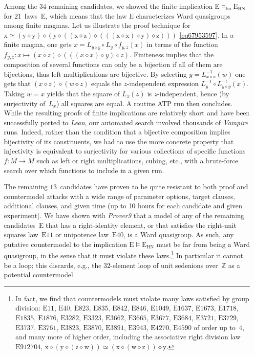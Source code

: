 \documentclass[12pt]{amsart}
\theoremstyle{definition}
\newcommand{\x}{\mathrm{x}}
\newcommand{\y}{\mathrm{y}}
\newcommand{\z}{\mathrm{z}}
\newcommand{\w}{\mathrm{w}}
\newcommand{\op}{\diamond}
\newcommand{\formaleq}{\simeq}
\newcommand{\modelsfin}{\models_{\mathrm{fin}}}
\newcommand{\Eq}[1]{\mathrm{E}#1}
\newcommand{\E}{\mathrm{E}}
\begin{document}
Among the $34$ remaining candidates, we showed the finite implication $\E\modelsfin\E_{\mathrm{HN}}$ for $21$~laws~$\E$, which means that the law $\E$ characterizes Ward quasigroups among finite magmas.  Let us illustrate the proof technique for $\x \formaleq (\y \op \y) \op (\y \op ((\x \op \z) \op (((\x \op \x) \op \y) \op \z)))$ \eqref{eq67953597}.  In a finite magma, one gets $x = L_{y\op y} \circ L_y \circ f_{y,z}(x)$ in terms of the function $f_{y,z}\colon x \mapsto (x\op z) \op (((x \op x) \op y) \op z)$.  Finiteness implies that the composition of several functions can only be a bijection if all of them are bijections, thus left multiplications are bijective.  By selecting $y=L_{x\op x}^{-1}(w)$ one gets that $(x\op z)\op (w\op z)$ equals the $z$-independent expression $L_y^{-1} \circ L_{y\op y}^{-1}(x)$.  Taking $w=x$ yields that the square of $L_x(z)$ is $z$-independent, hence (by surjectivity of~$L_x$) all squares are equal.  A routine ATP run then concludes.
While the resulting proofs of finite implications are relatively short and have been successfully ported to \emph{Lean}, our automated search involved thousands of \emph{Vampire} runs.
Indeed, rather than the condition that a bijective composition implies bijectivity of its constituents, we had to use the more concrete property that injectivity is equivalent to surjectivity for various collections of specific functions $f\colon M\to M$ such as left or right multiplications, cubing, etc.\@, with a brute-force search over which functions to include in a given run.

The remaining $13$~candidates have proven to be quite resistant to both proof and countermodel attacks with a wide range of parameter options, target clauses, additional clauses, and given time (up to 10 hours for each candidate and given experiment).  We have shown with \emph{Prover9} that a model of any of the remaining candidates~$\E$ that has a right-identity element, or that satisfies the right-unit squares law~$\Eq{11}$ or unipotence law~$\Eq{40}$, is a Ward quasigroup.  As such, any putative countermodel to the implication $\E\models\E_{\mathrm{HN}}$ must be far from being a Ward quasigroup, in the sense that it must violate these laws.\footnote{In fact, we find that countermodels must violate many laws satisfied by group division: $\Eq{11}$, $\Eq{40}$, $\Eq{823}$, $\Eq{835}$, $\Eq{842}$, $\Eq{846}$, $\Eq{1049}$, $\Eq{1637}$, $\Eq{1673}$, $\Eq{1718}$, $\Eq{1835}$, $\Eq{1876}$, $\Eq{3282}$, $\Eq{3323}$, $\Eq{3662}$, $\Eq{3665}$, $\Eq{3677}$, $\Eq{3684}$, $\Eq{3721}$, $\Eq{3729}$, $\Eq{3737}$, $\Eq{3761}$, $\Eq{3823}$, $\Eq{3870}$, $\Eq{3891}$, $\Eq{3943}$, $\Eq{4270}$, $\Eq{4590}$ of order up to~$4$, and many more of higher order, including the associative right division law $\Eq{912704}$, $\x\op(\y\op(\z\op\w)) \formaleq(\x\op(\w\op\z))\op\y$.}  In particular it cannot be a loop; this discards, e.g., the $32$-element loop of unit sedenions over~$\mathbb{Z}$ as a potential countermodel.
\end{document}
